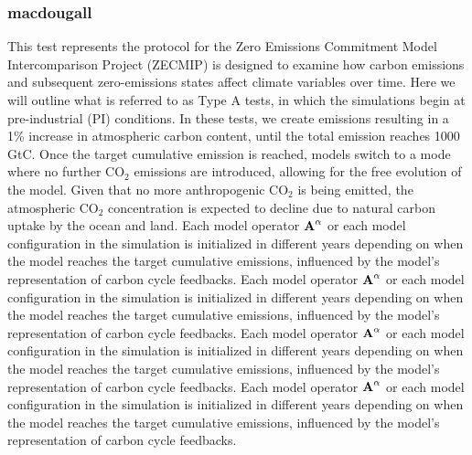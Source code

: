 \documentclass[11pt, a4paper, pdftex, twoside, dvipsnames]{article}
\newcommand{\bb}[1]{\boldsymbol{\bold{#1}}}
\begin{document}
\subsubsection{macdougall}
 This test represents the protocol for the Zero Emissions Commitment Model Intercomparison Project (ZECMIP) is designed to examine how carbon emissions and subsequent zero-emissions states affect climate variables over time.
%
Here we will outline what is referred to as Type A tests, in which the simulations begin at pre-industrial (PI) conditions. In these tests, we create emissions resulting in a 1\% increase in atmospheric carbon content, until the total emission reaches 1000 GtC.
%
Once the target cumulative emission is reached, models switch to a mode where no further CO$_2$ emissions are introduced, allowing for the free evolution of the model.
%
Given that no more anthropogenic CO$_2$ is being emitted, the atmospheric CO$_2$ concentration is expected to decline due to natural carbon uptake by the ocean and land.
%
Each model operator $\bb{A}^\alpha$  or each model configuration in the simulation is initialized in different years depending on when the model reaches the target cumulative emissions, influenced by the model's representation of carbon cycle feedbacks.
%
Each model operator $\bb{A}^\alpha$  or each model configuration in the simulation is initialized in different years depending on when the model reaches the target cumulative emissions, influenced by the model's representation of carbon cycle feedbacks.
%
Each model operator $\bb{A}^\alpha$  or each model configuration in the simulation is initialized in different years depending on when the model reaches the target cumulative emissions, influenced by the model's representation of carbon cycle feedbacks.
%
Each model operator $\bb{A}^\alpha$  or each model configuration in the simulation is initialized in different years depending on when the model reaches the target cumulative emissions, influenced by the model's representation of carbon cycle feedbacks.
%
\end{document}
